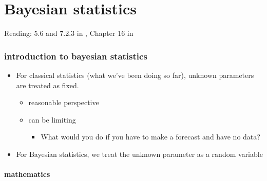

\part*{Bayesian statistics}%

Reading: 5.6 and 7.2.3 in \citet{CaB_2001}, Chapter 16 in \citet{Gre_2011}

\section{introduction to bayesian statistics}

\begin{itemize}
\item For classical statistics (what we've been doing so far), unknown parameters are treated as fixed.
\begin{itemize}
\item reasonable perspective
\item can be limiting
\begin{itemize}
\item What would you do if you have to make a forecast and have no data?
\end{itemize}
\end{itemize}
\item For Bayesian statistics, we treat the unknown parameter as a
      random variable
\end{itemize}

\subsection{mathematics}

